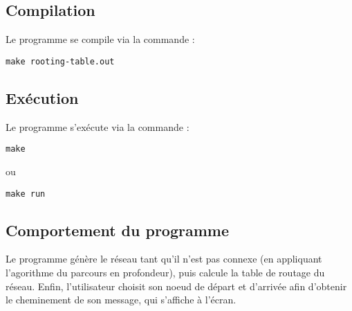 \documentclass{article}
\begin{document}
\subsection{Compilation}
Le programme se compile via la commande :
\begin{verbatim}
make rooting-table.out
\end{verbatim}

\subsection{Exécution}
Le programme s'exécute via la commande :
\begin{verbatim}
make
\end{verbatim}
ou
\begin{verbatim}
make run
\end{verbatim}

\subsection{Comportement du programme}
Le programme génère le réseau tant qu'il n'est pas connexe (en appliquant l'agorithme du parcours en profondeur), puis calcule la table de routage du réseau. Enfin, l'utilisateur choisit son noeud de départ et d'arrivée afin d'obtenir le cheminement de son message, qui s'affiche à l'écran.
\end{document}
